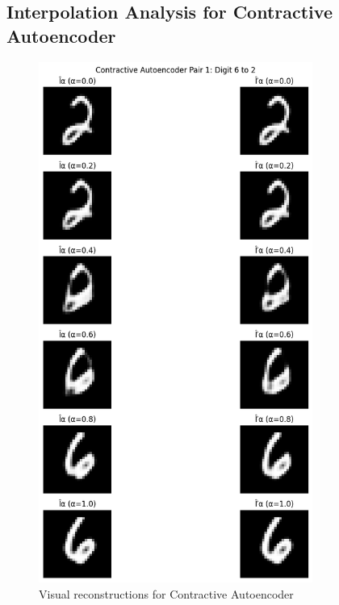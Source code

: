 \documentclass[12pt]{article}
\begin{document}
\subsection*{Interpolation Analysis for Contractive Autoencoder}
\begin{figure}
\centering
\includegraphics[width=0.8\textwidth,height=0.8\textheight,keepaspectratio]{IP_Contractive_Autoencoder_1.png}
\caption{Visual reconstructions for Contractive Autoencoder}
\end{figure}
\end{document}
